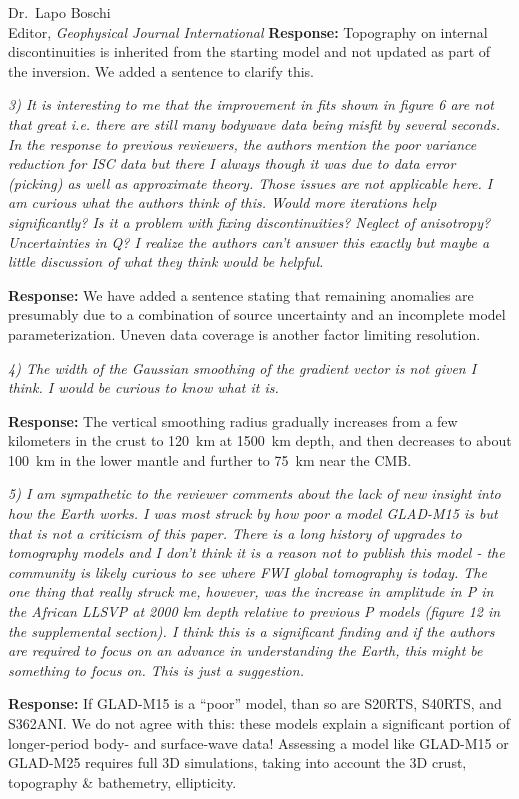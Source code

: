 \documentclass[11pt,a4paper]{letter}
\newcommand{\response}[1]{\textbf{Response:} #1}
\newcommand{\rev}[1]{{\it{#1}}}
\begin{document}
\begin{letter}{Dr.~Lapo Boschi\\
Editor, \textit{Geophysical Journal International}}
\response{
Topography on internal discontinuities is inherited from the starting model and not updated as part of the inversion. We added a sentence to clarify this.
}

\rev{
3) It is interesting to me that the improvement in fits shown in figure 6 are not that great i.e. there are still many bodywave data being misfit by several seconds.  In the response to previous reviewers, the authors mention the poor variance reduction for ISC data but there I always though it was due to data error (picking) as well as approximate theory. Those issues are not applicable here. I am curious what the authors think of this. Would more iterations help significantly? Is it a problem with fixing discontinuities? Neglect of anisotropy? Uncertainties in Q? I realize the authors can't answer this exactly but maybe a little discussion of what they think would be helpful.
}

\response{
We have added a sentence stating that remaining anomalies are presumably due to a combination of source uncertainty and an incomplete model parameterization. Uneven data coverage is another factor limiting resolution.
}

\rev{
4) The width of the Gaussian smoothing of the gradient vector is not given I think. I would be curious to know what it is.
}

\response{
The vertical smoothing radius gradually increases from a few kilometers in the crust to 120~km at 1500~km depth, and then decreases to about 100~km in the lower mantle and further to 75~km near the CMB.
}

\rev{
5) I am sympathetic to the reviewer comments about the lack of new insight into how the Earth works. I was most struck by how poor a model GLAD-M15 is but that is not a criticism of this paper. There is a long history of upgrades to tomography models and I don't think it is a reason not to publish this model - the community is likely curious to see where FWI global tomography is today. The one thing that really struck me, however, was the increase in amplitude in P in the African LLSVP at 2000 km depth relative to previous P models (figure 12 in the supplemental section). I think this is a significant finding and if the authors are required to focus on an advance in understanding the Earth, this might be something to focus on. This is just a suggestion.
}

\response{
If GLAD-M15 is a ``poor'' model, than so are S20RTS, S40RTS, and S362ANI. We do not agree with this: these models explain a significant portion of longer-period body- and surface-wave data!
Assessing a model like GLAD-M15 or GLAD-M25 requires full 3D simulations, taking into account the 3D crust, topography \& bathemetry, ellipticity.

}
\end{letter}
\end{document}
